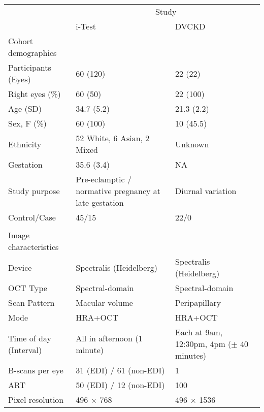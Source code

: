 \begin{tabular}{p{4cm}p{5cm}p{5cm}}
\toprule
\multirow{2}{*}{} & \multicolumn{2}{c}{Study} \\ \cmidrule(l){2-3}
 & i-Test \cite{dhaun2014optical} & \acrshort{DVCKD} \cite{dhaun2014optical, farrah2023choroidal} \\ 
 \midrule
Cohort demographics &  &  \\ \cmidrule(l){1-1}
Participants (Eyes) & 60 (120) & 22 (22) \\
Right eyes (\%) & 60 (50) & 22 (100) \\
Age (\acrshort{SD}) & 34.7 (5.2) & 21.3 (2.2) \\
Sex, F (\%) & 60 (100) & 10 (45.5) \\
Ethnicity & 52 White, 6 Asian, 2 Mixed & Unknown \\
Gestation & 35.6 (3.4) & NA \\
Study purpose & Pre-eclamptic / normative pregnancy at late gestation & Diurnal variation \\
Control/Case & 45/15 & 22/0 \\
 &  &  \\
Image characteristics &  &  \\ \cmidrule(l){1-1}
Device & Spectralis (Heidelberg) & Spectralis (Heidelberg) \\
\acrshort{OCT} Type & Spectral-domain & Spectral-domain \\
Scan Pattern & Macular volume & Peripapillary \\
Mode & \acrshort{HRA}+\acrshort{OCT} & \acrshort{HRA}+\acrshort{OCT} \\
Time of day (Interval) & All in afternoon (1 minute) & Each at 9am, 12:30pm, 4pm ($\pm$ 40 minutes) \\
B-scans per eye & 31 (\acrshort{EDI}) / 61 (non-\acrshort{EDI}) & 1 \\
\acrshort{ART} & 50 (\acrshort{EDI}) / 12 (non-\acrshort{EDI}) & 100 \\
Pixel resolution & 496 $\times$ 768 & 496 $\times$ 1536 \\ 
\bottomrule
\end{tabular}
